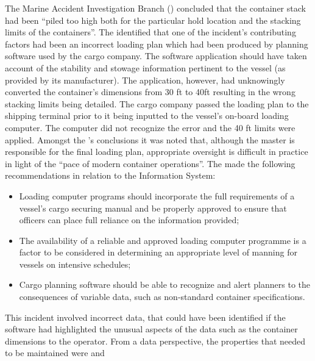 The Marine Accident Investigation Branch () concluded that the container stack had been ``piled too high both for the particular hold location and the stacking limits of the containers''. The  identified that one of the incident’s contributing factors had been an incorrect loading plan which had been produced by planning software used by the cargo company. The software application should have taken account of the stability and stowage information pertinent to the vessel (as provided by its manufacturer). The application, however, had unknowingly converted the container’s dimensions from 30 ft to 40ft resulting in the wrong stacking limits being detailed. The cargo company passed the loading plan to the shipping terminal prior to it being inputted to the vessel’s on-board loading computer. The computer did not recognize the error and the 40 ft limits were applied. Amongst the ’s conclusions it was noted that, although the master is responsible for the final loading plan, appropriate oversight is difficult in practice in light of the ``pace of modern container operations''. The  made the following recommendations in relation to the Information System:
\begin{itemize}
\item Loading computer programs should incorporate the full requirements of a vessel’s cargo securing manual and be properly approved to ensure that officers can place full reliance on the information provided;
\item The \gls{availability} of a reliable and approved loading computer programme is a factor to be considered in determining an appropriate level of manning for vessels on intensive schedules; 
\item Cargo planning software should be able to recognize and alert planners to the consequences of variable data, such as non-standard container specifications.
\end{itemize}

This incident involved incorrect data, that could have been identified if the software had highlighted the unusual aspects of the data such as the container dimensions to the operator. From a data perspective, the properties that needed to be maintained were  and 

